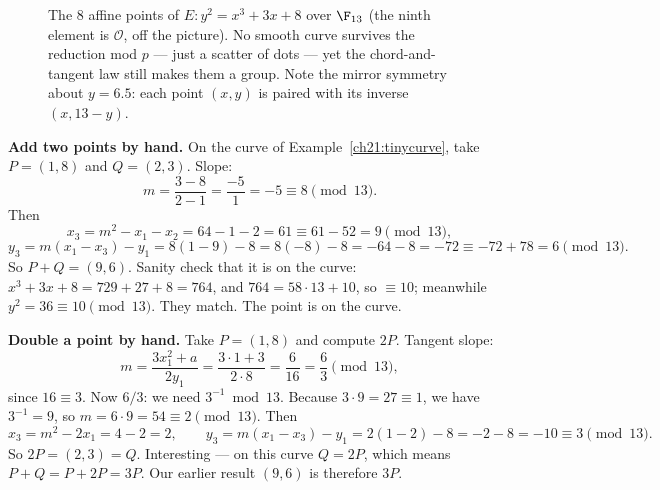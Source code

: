 \begin{figure}[H]
\centering
{}
\caption{The $8$ affine points of $E:y^2=x^3+3x+8$ over $\F_{13}$ (the ninth element is
$\mathcal{O}$, off the picture). No smooth curve survives the reduction mod $p$ --- just
a scatter of dots --- yet the chord-and-tangent law still makes them a group. Note the
mirror symmetry about $y=6.5$: each point $(x,y)$ is paired with its inverse $(x,13-y)$.}
\label{ch21:scatter-fig}
\end{figure}

\begin{walkbox}
\textbf{Add two points by hand.} On the curve of Example~\ref{ch21:tinycurve}, take
$P=(1,8)$ and $Q=(2,3)$. Slope:
\[
m = \frac{3-8}{2-1} = \frac{-5}{1} = -5 \equiv 8 \pmod{13}.
\]
Then
\[
x_3 = m^2 - x_1 - x_2 = 64 - 1 - 2 = 61 \equiv 61 - 52 = 9 \pmod{13},
\]
\[
y_3 = m(x_1 - x_3) - y_1 = 8(1 - 9) - 8 = 8(-8) - 8 = -64 - 8 = -72 \equiv -72 + 78 = 6 \pmod{13}.
\]
So $P+Q = (9,6)$. Sanity check that it is on the curve: $x^3+3x+8 = 729 + 27 + 8 = 764$,
and $764 = 58\cdot 13 + 10$, so $\equiv 10$; meanwhile $y^2 = 36 \equiv 10 \pmod{13}$.
They match. The point is on the curve.
\end{walkbox}

\begin{walkbox}
\textbf{Double a point by hand.} Take $P=(1,8)$ and compute $2P$. Tangent slope:
\[
m = \frac{3x_1^2 + a}{2y_1} = \frac{3\cdot 1 + 3}{2\cdot 8} = \frac{6}{16} = \frac{6}{3}
\pmod{13},
\]
since $16 \equiv 3$. Now $6/3$: we need $3^{-1} \bmod 13$. Because $3\cdot 9 = 27 \equiv 1$,
we have $3^{-1} = 9$, so $m = 6\cdot 9 = 54 \equiv 2 \pmod{13}$. Then
\[
x_3 = m^2 - 2x_1 = 4 - 2 = 2, \qquad
y_3 = m(x_1 - x_3) - y_1 = 2(1-2) - 8 = -2 - 8 = -10 \equiv 3 \pmod{13}.
\]
So $2P = (2,3) = Q$. Interesting --- on this curve $Q = 2P$, which means
$P + Q = P + 2P = 3P$. Our earlier result $(9,6)$ is therefore $3P$.
\end{walkbox}

